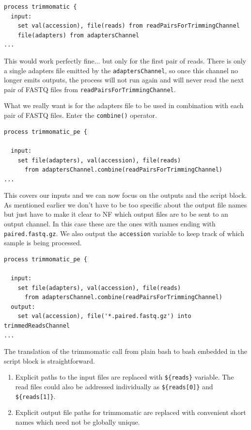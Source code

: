 \begin{lstlisting}
process trimmomatic {
  input:
    set val(accession), file(reads) from readPairsForTrimmingChannel
    file(adapters) from adaptersChannel
...    
\end{lstlisting}

This would work perfectly fine... but only for the first pair of reads. 
There is only a single adapters file emitted by the \texttt{adaptersChannel}, 
so once this channel no longer emits outputs, the process will not run again
and will never read the next pair of FASTQ files from \texttt{readPairsForTrimmingChannel}.

What we really want is for the adapters file to be used in combination with 
each pair of FASTQ files. Enter the \texttt{combine()} operator.

\begin{lstlisting}
process trimmomatic_pe {

  input:
    set file(adapters), val(accession), file(reads) 
      from adaptersChannel.combine(readPairsForTrimmingChannel)
...
\end{lstlisting}

This covers our inputs and we can now focus on the outputs and the script block.
As mentioned earlier we don't have to be too specific about the output file names 
but just have to make it clear to NF which output files are to be sent to an output channel.
In this case these are the ones with names ending with \texttt{paired.fastq.gz}.
We also output the \texttt{accession} variable to keep track of which sample is being processed.

\begin{lstlisting}
process trimmomatic_pe {

  input:
    set file(adapters), val(accession), file(reads) 
      from adaptersChannel.combine(readPairsForTrimmingChannel)
  output:
    set val(accession), file('*.paired.fastq.gz') into trimmedReadsChannel
...
\end{lstlisting}

The translation of the trimmomatic call from plain bash to bash embedded in the script block 
is straightforward. 

\begin{enumerate}
 \item Explicit paths to the input files are replaced with \texttt{\$\{reads\}} variable. The read files could also be addressed individually as \texttt{\$\{reads[0]\}} and \texttt{\$\{reads[1]\}}.
 \item Explicit output file paths for trimmomatic are replaced with convenient short names which need not be globally unique. 
\end{enumerate}



